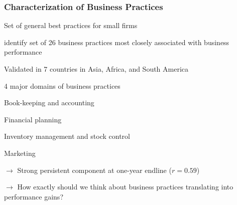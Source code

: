 \documentclass[hideothersubsections, usenames,dvipsnames,11pt]{beamer}
\newenvironment{itemize_2pt}{\itemize\addtolength{\itemsep}{2pt}}{\enditemize}
\newenvironment{enumerate_2pt}{\enumerate\addtolength{\itemsep}{2pt}}{\endenumerate}
\begin{document}
\begin{frame}
\frametitle{Characterization of Business Practices}

Set of general best practices for small firms

\begin{itemize_2pt}
	\item \citet{McKenzie2017} identify set of \textcolor{bdf}{26 business practices} most closely associated with business performance
		
	\begin{itemize_2pt}	
	\vspace{0.5em}
	
		\item Validated in \textcolor{bdf}{7 countries} in Asia, Africa, and South America

		\item \textcolor{bdf}{4 major domains} of business practices
		\begin{enumerate_2pt}
			\item Book-keeping and accounting
			\item Financial planning
			\item Inventory management and stock control
			\item Marketing
		\end{enumerate_2pt}	
		
		\vspace{0.5em}	
		
		\item[] $\rightarrow$ \textcolor{bdf}{Strong persistent component} at one-year endline ($r=0.59$)
	\end{itemize_2pt}
	
	\item[] $\rightarrow$ How exactly should we think about business practices translating into performance gains?
	
\end{itemize_2pt}

\end{frame}


	
		
	
\end{document}
